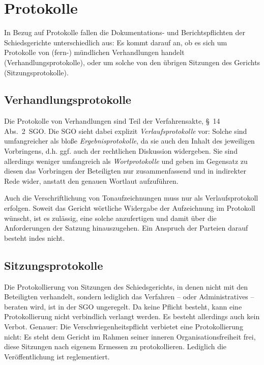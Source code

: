 \section{Protokolle}
\label{Dokumentation:Protokolle}
In Bezug auf Protokolle fallen die Dokumentations- und Berichtspflichten der Schiedsgerichte unterschiedlich aus:
Es kommt darauf an, ob es sich um Protokolle von (fern-) mündlichen Verhandlungen handelt (Verhandlungsprotokolle), oder um solche von den übrigen Sitzungen des Gerichts (Sitzungsprotokolle).

\subsection{Verhandlungsprotokolle}
\label{Dokumentation:Protokolle:Verhandlungsprotokolle}
Die Protokolle von Verhandlungen sind Teil der Verfahrensakte, \S~14 Abs.~2~SGO.
Die SGO sieht dabei explizit \emph{Verlaufsprotokolle} vor:
Solche sind umfangreicher als bloße \emph{Ergebnisprotokolle}, da sie auch den Inhalt des jeweiligen Vorbringens, d.h. ggf. auch der rechtlichen Diskussion widergeben.
Sie sind allerdings weniger umfangreich als \emph{Wortprotokolle} und geben im Gegensatz zu diesen das Vorbringen der Beteiligten nur zusammenfassend und in indirekter Rede wider, anstatt den genauen Wortlaut aufzuführen.

Auch die Verschriftlichung von Tonaufzeichnungen muss nur als Verlaufsprotokoll erfolgen.
Soweit das Gericht wörtliche Widergabe der Aufzeichnung im Protokoll wünscht, ist es zulässig, eine solche anzufertigen und damit über die Anforderungen der Satzung hinauszugehen.
Ein Anspruch der Parteien darauf besteht indes nicht.

\subsection{Sitzungsprotokolle}
\label{Dokumentation:Protokolle:Sitzungsprotokolle}
Die Protokollierung von Sitzungen des Schiedsgerichts, in denen nicht mit den Beteiligten verhandelt, sondern lediglich das Verfahren -- oder Administratives -- beraten wird, ist in der SGO ungeregelt.
Da keine Pflicht besteht, kann eine Protokollierung nicht verbindlich verlangt werden.
Es besteht allerdings auch kein Verbot.
Genauer:
Die Verschwiegenheitspflicht verbietet eine Protokollierung nicht:
Es steht dem Gericht im Rahmen seiner inneren Organisationsfreiheit frei, diese Sitzungen nach eigenem Ermessen zu protokollieren.
Lediglich die Veröffentlichung ist reglementiert.

